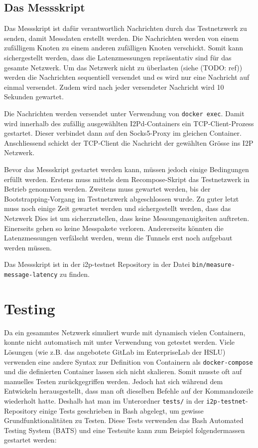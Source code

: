 \subsection{Das Messskript}\label{sec:messskript}

Das Messskript ist dafür verantwortlich Nachrichten durch das Testnetzwerk zu senden, damit Messdaten erstellt werden.
Die Nachrichten werden von einem zufälligem Knoten zu einem anderen zufälligen Knoten verschickt.
Somit kann sichergestellt werden, dass die Latenzmessungen repräsentativ sind für das gesamte Netzwerk.
Um das Netzwerk nicht zu überlasten (siehe (TODO: ref)) werden die Nachrichten sequentiell versendet und es wird nur eine Nachricht auf einmal versendet.
Zudem wird nach jeder versendeter Nachricht wird 10 Sekunden gewartet.

Die Nachrichten werden versendet unter Verwendung von \lstinline|docker exec|.
Damit wird innerhalb des zufällig ausgewählten I2Pd-Containers ein TCP-Client-Prozess gestartet.
Dieser verbindet dann auf den Socks5-Proxy im gleichen Container.
Anschliessend schickt der TCP-Client die Nachricht der gewählten Grösse ins I2P Netzwerk.

Bevor das Messskript gestartet werden kann, müssen jedoch einige Bedingungen erfüllt werden.
Erstens muss mittels dem Recompose-Skript das Testnetzwerk in Betrieb genommen werden.
Zweitens muss gewartet werden, bis der Bootstrapping-Vorgang im Testnetzwerk abgeschlossen wurde.
Zu guter letzt muss noch einige Zeit gewartet werden und sichergestellt werden, dass das Netzwerk 
Dies ist um sicherzustellen, dass keine Messungenauigkeiten auftreten.
Einerseits gehen so keine Messpakete verloren. Andererseits könnten die Latenzmessungen verfälscht werden, wenn die Tunnels erst noch aufgebaut werden müssen.

Das Messskript ist in der i2p-testnet Repository in der Datei \lstinline|bin/measure-message-latency| zu finden.

\section{Testing}

Da ein gesammtes Netzwerk simuliert wurde mit dynamisch vielen Containern, konnte nicht automatisch mit unter Verwendung von  getestet werden.
Viele  Lösungen (wie z.B. das angebotete GitLab im EnterpriseLab der HSLU) verwenden eine andere Syntax zur Definition von Containern als \lstinline|docker-compose| und die definierten Container lassen sich nicht skalieren.
Somit musste oft auf manuelles Testen zurückgegriffen werden.
Jedoch hat sich während dem Entwickeln herausgestellt, dass man oft dieselben Befehle auf der Kommandozeile wiederholt hatte.
Deshalb hat man im Unterordner
\lstinline|tests/| in der \lstinline|i2p-testnet|-Repository einige Tests geschrieben in Bash abgelegt, um gewisse Grundfunktionalitäten zu Testen.
Diese Tests verwenden das Bash Automated Testing System (BATS) und eine Testsuite kann zum Beispiel folgendermassen gestartet werden:

